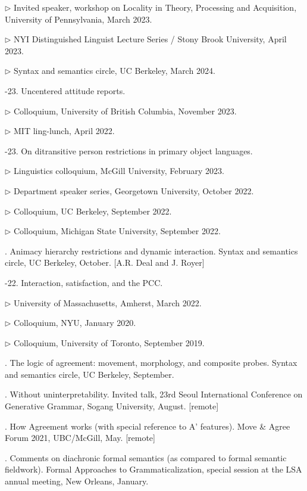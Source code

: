 \documentclass[12pt]{article}
\begin{document}
\indd $\rhd$ Invited speaker, workshop on Locality in Theory, Processing and Acquisition, University of Pennsylvania, March 2023.

\indd $\rhd$ NYI Distinguished Linguist Lecture Series / Stony Brook University, April 2023. 

\indd $\rhd$ Syntax and semantics circle, UC Berkeley, March 2024.

-23. Uncentered attitude reports. 

\indd $\rhd$ Colloquium, University of British Columbia, November 2023. 

\indd $\rhd$ MIT ling-lunch, April 2022. 





-23. On ditransitive person restrictions in primary object languages. 

\indd $\rhd$ Linguistics colloquium, McGill University, February 2023. 

\indd $\rhd$ Department speaker series, Georgetown University, October 2022.

\indd $\rhd$ Colloquium, UC Berkeley, September 2022. 

\indd $\rhd$ Colloquium, Michigan State University, September 2022. 

. Animacy hierarchy restrictions and dynamic interaction. Syntax and semantics circle, UC Berkeley, October. [A.R. Deal and J. Royer]
 
-22. Interaction, satisfaction, and the PCC. 

\indd $\rhd$ University of Massachusetts, Amherst, March 2022.

\indd $\rhd$ Colloquium, NYU, January 2020.

\indd $\rhd$ Colloquium, University of Toronto, September 2019.



. The logic of agreement: movement, morphology, and composite probes. Syntax and semantics circle, UC Berkeley, September.

. Without uninterpretability. Invited talk, 23rd Seoul International Conference on Generative Grammar, Sogang University, August. [remote]

. How Agreement works (with special reference to A' features). Move \& Agree Forum 2021, UBC/McGill, May. [remote]




. Comments on diachronic formal semantics (as compared to formal semantic fieldwork). Formal Approaches to Grammaticalization, special session at the LSA annual meeting, New Orleans, January. 
\end{document}
